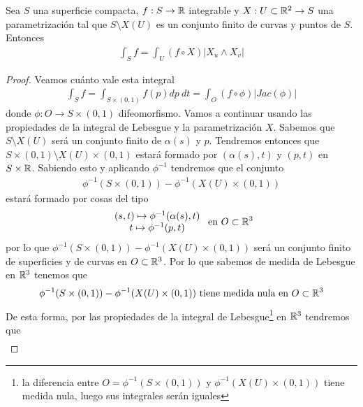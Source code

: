 \begin{prop}
    Sea $S$ una superficie compacta, $f:S\to \mathbb{R}$ integrable y $X: U \subset \mathbb{R}^2 \to S$ una parametrización tal que $S\setminus X(U)$ es un conjunto finito de curvas y puntos de $S$. Entonces
    \begin{gather*}
        \int_S f = \int_U (f\circ X)|X_u\wedge X_v|
    \end{gather*}

    \begin{proof}
        Veamos cuánto vale esta integral
        \begin{gather*}
            \int_S f = \int_{S \times(0,1)} f(p) dp \ dt = \int_O (f\circ \phi) |Jac(\phi)|
        \end{gather*}
        donde $\phi: O \to S\times(0,1)$ difeomorfismo. Vamos a continuar usando las propiedades de la integral de Lebesgue y la parametrización $X$. Sabemos que $S \setminus X(U)$ será un conjunto finito de $\alpha(s)$ y $p$. Tendremos entonces que $S \times (0,1) \setminus X(U)\times (0,1) $ estará formado por $(\alpha(s), t)$ y $(p,t)$ en $S\times \mathbb{R}$. Sabiendo esto y aplicando $\phi^{-1}$ tendremos que el conjunto
        \begin{gather*}
            \phi^{-1}(S \times (0,1)) - \phi^{-1}(X(U)\times(0,1))
        \end{gather*}
        estará formado por cosas del tipo
        \begin{gather*}
            \begin{array}{c}
                (s,t) \mapsto \phi^{-1}(\alpha(s), t) \\
                t \mapsto \phi^{-1}(p,t)
            \end{array}
            \text{ en } O\subset \mathbb{R}^3
        \end{gather*}
        por lo que $\phi^{-1}(S \times (0,1)) - \phi^{-1}(X(U)\times(0,1))$ será un conjunto finito de superficies y de curvas en $O\subset \mathbb{R}^3$. Por lo que sabemos de medida de Lebesgue en $\mathbb{R}^3$ tenemos que 
        \begin{gather*}
            \phi^{-1}(S \times (0,1)) - \phi^{-1}(X(U)\times(0,1)) \text{ tiene medida nula en $O\subset \mathbb{R}^3$}
        \end{gather*}
        De esta forma, por las propiedades de la integral de Lebesgue\footnote{la diferencia entre $O=\phi^{-1}(S\times(0,1))$ y $\phi^{-1}(X(U)\times(0,1))$ tiene medida nula, luego sus integrales serán iguales} en $\mathbb{R}^3$ tendremos que  
        \begin{gather*}

\end{gather*}
\end{proof}
\end{prop}
